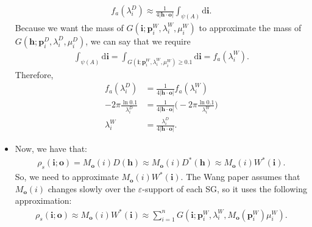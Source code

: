 \documentclass[10pt]{article}
\newcommand{\dee}{\mathrm{d}}
\newcommand{\ve}[1]{\mathbf{#1}}
\begin{document}
\begin{itemize}
\begin{align*}
      f_a(\lambda_i^D) \approx \frac{1}{4|\ve{h} \cdot \ve{o}|} \int_{\psi(A)} \dee\ve{i}.
    \end{align*}
    Because we want the mass of $G(\ve{i}; \ve{p}_i^W, \lambda_i^W, \mu_i^W)$ to approximate the mass of $G(\ve{h}; \ve{p}_i^D, \lambda_i^D, \mu_i^D)$, we can say that we require
    \begin{align*}
      \int_{\psi(A)} \dee\ve{i} = \int_{G(\ve{i}; \ve{p}_i^W, \lambda_i^W, \mu_i^W) \geq 0.1} \dee\ve{i} = f_a(\lambda_i^W).
    \end{align*}
    Therefore,
    \begin{align*}
      f_a(\lambda_i^D) &= \frac{1}{4|\ve{h} \cdot \ve{o}|} f_a(\lambda_i^W) \\
      -2\pi \frac{\ln 0.1}{\lambda_i^D} &= \frac{1}{4|\ve{h} \cdot \ve{o}|} \bigg( -2\pi \frac{\ln 0.1}{\lambda_i^W} \bigg) \\
      \lambda_i^W &= \frac{\lambda_i^D}{4|\ve{h} \cdot \ve{o}|}.
    \end{align*}

    \item Now, we have that:
    \begin{align*}
      \rho_s(\ve{i}; \ve{o}) 
      = M_{\ve{o}}(i) D(\ve{h}) 
      \approx M_{\ve{o}}(i) D^*(\ve{h}) 
      \approx M_{\ve{o}}(i) W^*(\ve{i}).
    \end{align*}
    So, we need to approximate $M_{\ve{o}}(i) W^*(\ve{i})$.  The Wang paper assumes that $M_{\ve{o}}(i)$ changes slowly over the $\varepsilon$-support of each SG, so it uses the following approximation:
    \begin{align*}
      \rho_s(\ve{i}; \ve{o})
      \approx M_{\ve{o}}(i) W^*(\ve{i}) 
      \approx \sum_{i=1}^n G(\ve{i}; \ve{p}_i^W, \lambda_i^W, M_\ve{o}(\ve{p}_i^W) \mu_i^W ).
    \end{align*}
  \end{itemize}
\end{document}
